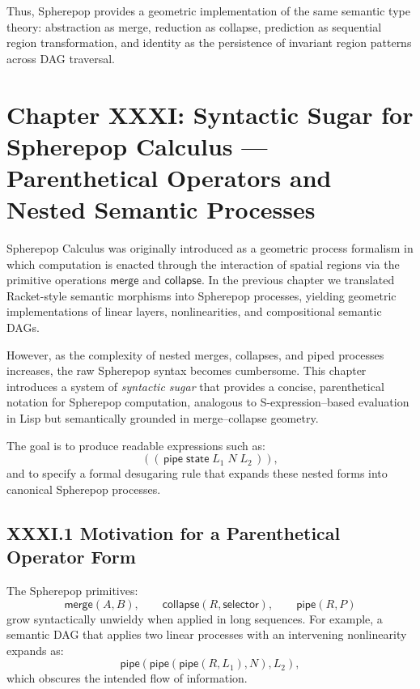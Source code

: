 \documentclass[11pt,letterpaper]{article}
\begin{document}
Thus, Spherepop provides a geometric implementation of the same semantic type theory: abstraction as merge, reduction as collapse, prediction as sequential region transformation, and identity as the persistence of invariant region patterns across DAG traversal.

\newpage

\section{Chapter XXXI: Syntactic Sugar for Spherepop Calculus —  
Parenthetical Operators and Nested Semantic Processes}

Spherepop Calculus was originally introduced as a geometric process formalism in which computation is enacted through the interaction of spatial regions via the primitive operations $\mathsf{merge}$ and $\mathsf{collapse}$. In the previous chapter we translated Racket-style semantic morphisms into Spherepop processes, yielding geometric implementations of linear layers, nonlinearities, and compositional semantic DAGs.

However, as the complexity of nested merges, collapses, and piped processes increases, the raw Spherepop syntax becomes cumbersome. This chapter introduces a system of \emph{syntactic sugar} that provides a concise, parenthetical notation for Spherepop computation, analogous to S-expression–based evaluation in Lisp but semantically grounded in merge--collapse geometry.

The goal is to produce readable expressions such as:
\[
((\,\mathsf{pipe}\; \mathsf{state}\; L_1\; N\; L_2\,)),
\]
and to specify a formal desugaring rule that expands these nested forms into canonical Spherepop processes.

\subsection{XXXI.1 Motivation for a Parenthetical Operator Form}

The Spherepop primitives:
\[
\mathsf{merge}(A,B), \qquad
\mathsf{collapse}(R, \mathsf{selector}), \qquad
\mathsf{pipe}(R, P)
\]
grow syntactically unwieldy when applied in long sequences. For example, a semantic DAG that applies two linear processes with an intervening nonlinearity expands as:
\[
\mathsf{pipe}( \mathsf{pipe}( \mathsf{pipe}(R, L_1), N), L_2),
\]
which obscures the intended flow of information.
\end{document}
